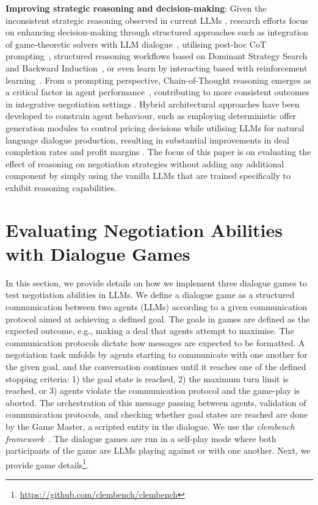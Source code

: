 \documentclass[11pt]{article}
\begin{document}
\textbf{Improving strategic reasoning and decision-making}: Given the inconsistent strategic reasoning observed in current LLMs \cite{wong2025reasoningcapabilitieslargelanguage}, research efforts focus on enhancing decision-making through structured approaches such as integration of game-theoretic solvers with LLM dialogue~\cite{DBLP:journals/corr/abs-2402-01704}, utilising post-hoc CoT prompting~\cite{abdelnabi2024llmdeliberation}, structured reasoning workflows based on Dominant Strategy Search and Backward Induction~\cite{DBLP:journals/corr/abs-2411-05990}, or even learn by interacting based with reinforcement learning~\cite{DBLP:conf/iclr/CaoLLLTC18}. From a prompting perspective, Chain-of-Thought reasoning emerges as a critical factor in agent performance~\cite{DBLP:journals/corr/abs-2305-19165}, contributing to more consistent outcomes in integrative negotiation settings \cite{DBLP:journals/corr/abs-2503-06416}. Hybrid architectural approaches have been developed to constrain agent behaviour, such as employing deterministic offer generation modules to control pricing decisions while utilising LLMs for natural language dialogue production, resulting in substantial improvements in deal completion rates and profit margins \cite{DBLP:conf/acl/Xia0RMZ0024}. The focus of this paper is on evaluating the effect of reasoning on negotiation strategies without adding any additional component by simply using the vanilla LLMs that are trained specifically to exhibit reasoning capabilities.

\section{Evaluating Negotiation Abilities with Dialogue Games}

In this section, we provide details on how we implement three dialogue games to test negotiation abilities in LLMs. We define a dialogue game as a structured communication between two agents (LLMs) according to a given communication protocol aimed at achieving a defined goal. The goals in games are defined as the expected outcome, e.g., making a deal that agents attempt to maximise. The communication protocols dictate how messages are expected to be formatted. A negotiation task unfolds by agents starting to communicate with one another for the given goal, and the conversation continues until it reaches one of the defined stopping criteria: 1) the goal state is reached, 2) the maximum turn limit is reached, or 3) agents violate the communication protocol and the game-play is aborted. The orchestration of this message passing between agents, validation of communication protocols, and checking whether goal states are reached are done by the Game Master, a scripted entity in the dialogue. We use the \textit{clembench framework}~\cite{chalamalasetti-etal-2023-clembench}. The dialogue games are run in a self-play mode where both participants of the game are LLMs playing against or with one another. Next, we provide game details\footnote{\url{https://github.com/clembench/clembench}}.
\end{document}
